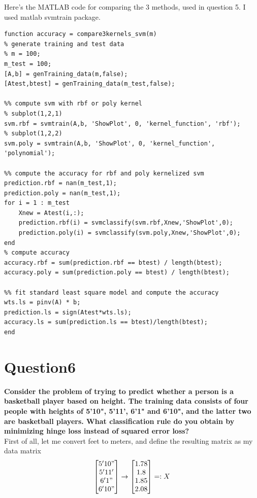 \documentclass[paper=a4, fontsize=11pt]{scrartcl} %
\numberwithin{equation}{section} %
\numberwithin{figure}{section} %
\numberwithin{table}{section} %
\begin{document}
Here's the MATLAB code for comparing the 3 methods, used in question 5. I used matlab svmtrain package. 
\begin{lstlisting}
function accuracy = compare3kernels_svm(m)
% generate training and test data
% m = 100;
m_test = 100;
[A,b] = genTraining_data(m,false);
[Atest,btest] = genTraining_data(m_test,false);

%% compute svm with rbf or poly kernel
% subplot(1,2,1)
svm.rbf = svmtrain(A,b, 'ShowPlot', 0, 'kernel_function', 'rbf');
% subplot(1,2,2)
svm.poly = svmtrain(A,b, 'ShowPlot', 0, 'kernel_function', 'polynomial');

%% compute the accuracy for rbf and poly kernelized svm
prediction.rbf = nan(m_test,1);
prediction.poly = nan(m_test,1);
for i = 1 : m_test
    Xnew = Atest(i,:);
    prediction.rbf(i) = svmclassify(svm.rbf,Xnew,'ShowPlot',0);
    prediction.poly(i) = svmclassify(svm.poly,Xnew,'ShowPlot',0);
end
% compute accuracy
accuracy.rbf = sum(prediction.rbf == btest) / length(btest);
accuracy.poly = sum(prediction.poly == btest) / length(btest);

%% fit standard least square model and compute the accuracy
wts.ls = pinv(A) * b;
prediction.ls = sign(Atest*wts.ls);
accuracy.ls = sum(prediction.ls == btest)/length(btest);
end
\end{lstlisting}


\newpage
\section*{Question6}
\textbf{Consider the problem of trying to predict whether a person is a basketball player based on height. The training data consists of four people with heights of 5'10", 5'11', 6'1" and 6'10", and the latter two are basketball players. What classification rule do you obtain by minimizing hinge loss instead of squared error loss?}\\

First of all, let me convert feet to meters, and define the resulting matrix as my data matrix\\
$$
\begin{bmatrix}
5'10"	\\
5'11'	\\
6'1" 	\\
6'10"
\end{bmatrix}
\rightarrow
\begin{bmatrix}
1.78		\\
1.8		\\
1.85	 	\\
2.08
\end{bmatrix}
=: X
$$
\end{document}
